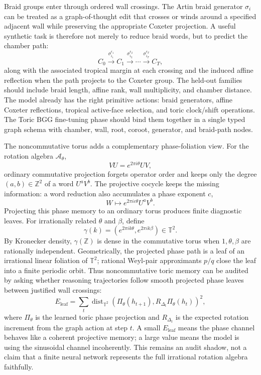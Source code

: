 \documentclass[11pt]{article}
\theoremstyle{definition}
\theoremstyle{plain}
\theoremstyle{remark}
\numberwithin{equation}{section}
\newcommand{\Z}{\mathbb{Z}}
\newcommand{\A}{\mathcal{A}}
\newcommand{\dist}{\operatorname{dist}}
\begin{document}
Braid groups enter through ordered wall crossings.  The Artin braid generator $\sigma_i$ can be treated as a graph-of-thought edit that crosses or winds around a specified adjacent wall while preserving the appropriate Coxeter projection.  A useful synthetic task is therefore not merely to reduce braid words, but to predict the chamber path:
\begin{equation}
  C_0 \xrightarrow{\sigma_{i_1}^{\epsilon_1}} C_1
  \xrightarrow{\sigma_{i_2}^{\epsilon_2}}\cdots
  \xrightarrow{\sigma_{i_T}^{\epsilon_T}} C_T,
\end{equation}
along with the associated tropical margin at each crossing and the induced affine reflection when the path projects to the Coxeter group.  The held-out families should include braid length, affine rank, wall multiplicity, and chamber distance.  The model already has the right primitive actions: braid generators, affine Coxeter reflections, tropical active-face selection, and toric clock/shift operations.  The Toric BGG fine-tuning phase should bind them together in a single typed graph schema with chamber, wall, root, coroot, generator, and braid-path nodes.

The noncommutative torus adds a complementary phase-foliation view.  For the rotation algebra $\A_\theta$,
\begin{equation}
  VU=e^{2\pi i\theta}UV,
\end{equation}
ordinary commutative projection forgets operator order and keeps only the degree $(a,b)\in\Z^2$ of a word $U^aV^b$.  The projective cocycle keeps the missing information: a word reduction also accumulates a phase exponent $c$,
\begin{equation}
  W\mapsto e^{2\pi i c\theta}U^aV^b.
\end{equation}
Projecting this phase memory to an ordinary torus produces finite diagnostic leaves.  For irrationally related $\theta$ and $\beta$, define
\begin{equation}
  \gamma(k)=\left(e^{2\pi i k\theta},e^{2\pi i k\beta}\right)\in\mathbb T^2.
\end{equation}
By Kronecker density, $\gamma(\Z)$ is dense in the commutative torus when $1,\theta,\beta$ are rationally independent.  Geometrically, the projected phase path is a leaf of an irrational linear foliation of $\mathbb T^2$; rational Weyl-pair approximants $p/q$ close the leaf into a finite periodic orbit.  Thus noncommutative toric memory can be audited by asking whether reasoning trajectories follow smooth projected phase leaves between justified wall crossings:
\begin{equation}
  E_{\mathrm{leaf}}=\sum_t
  \dist_{\mathbb T^2}\!\left(\Pi_\theta(h_{t+1}),
  R_{\Delta_t}\Pi_\theta(h_t)\right)^2,
\end{equation}
where $\Pi_\theta$ is the learned toric phase projection and $R_{\Delta_t}$ is the expected rotation increment from the graph action at step $t$.  A small $E_{\mathrm{leaf}}$ means the phase channel behaves like a coherent projective memory; a large value means the model is using the sinusoidal channel incoherently.  This remains an audit shadow, not a claim that a finite neural network represents the full irrational rotation algebra faithfully.
\end{document}
